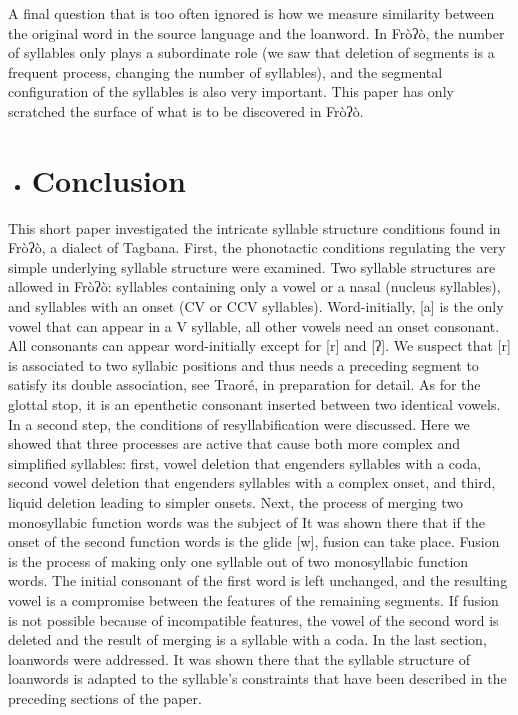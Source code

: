 A final question that is too often ignored is how we measure similarity between the original word in the source language and the loanword. In Fròʔò, the number of syllables only plays a subordinate role (we saw that deletion of segments is a frequent process, changing the number of syllables), and the segmental configuration of the syllables is also very important. This paper has only scratched the surface of what is to be discovered in Fròʔò.

\begin{itemize}
\item \section{ Conclusion}\end{itemize}

This short paper investigated the intricate syllable structure conditions found in Fròʔò, a dialect of Tagbana. First, the phonotactic conditions regulating the very simple underlying syllable structure were examined. Two syllable structures are allowed in Fròʔò: syllables containing only a vowel or a nasal (nucleus syllables), and syllables with an onset (CV or CCV syllables). Word-initially, [a] is the only vowel that can appear in a V syllable, all other vowels need an onset consonant. All consonants can appear word-initially except for [r] and [ʔ]. We suspect that [r] is associated to two syllabic positions and thus needs a preceding segment to satisfy its double association, see Traoré, in preparation for detail. As for the glottal stop, it is an epenthetic consonant inserted between two identical vowels. In a second step, the conditions of resyllabification were discussed. Here we showed that three processes are active that cause both more complex and simplified syllables: first, vowel deletion that engenders syllables with a coda, second vowel deletion that engenders syllables with a complex onset, and third, liquid deletion leading to simpler onsets. Next, the process of merging two monosyllabic function words was the subject of  It was shown there that if the onset of the second function words is the glide [w], fusion can take place. Fusion is the process of making only one syllable out of two monosyllabic function words. The initial consonant of the first word is left unchanged, and the resulting vowel is a compromise between the features of the remaining segments. If fusion is not possible because of incompatible features, the vowel of the second word is deleted and the result of merging is a syllable with a coda. In the last section, loanwords were addressed. It was shown there that the syllable structure of loanwords is adapted to the syllable’s constraints that have been described in the preceding sections of the paper.  

